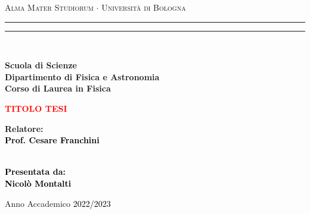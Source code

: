 \begin{titlepage}


    \begin{center}
        {{\Large{\textsc{Alma Mater Studiorum $\cdot$ Universit\`a di Bologna}}}}
        \rule[0.1cm]{15.8cm}{0.1mm}
        \rule[0.5cm]{15.8cm}{0.6mm}
        \\\vspace{3mm}

        {\small{\bf Scuola di Scienze \\
                Dipartimento di Fisica e Astronomia\\
                Corso di Laurea in Fisica}}

    \end{center}

    \vspace{23mm}

    \begin{center}\textcolor{red}{
            {\LARGE{\bf TITOLO TESI}}\\
        }\end{center}

    \vspace{50mm} \par \noindent

    \begin{minipage}[t]{0.47\textwidth}
        {\large{\bf Relatore: \vspace{2mm}\\\textcolor{black}{
                    Prof. Cesare Franchini}\\\\
            }}
    \end{minipage}
    \hfill
    \begin{minipage}[t]{0.47\textwidth}\raggedleft \textcolor{black}
        {\large{\bf Presentata da:
                \vspace{2mm}\\
                Nicolò Montalti}}
    \end{minipage}

    \vspace{40mm}

    \begin{center}
        Anno Accademico \textcolor{black}{ 2022/2023}
    \end{center}

\end{titlepage}
\restoregeometry